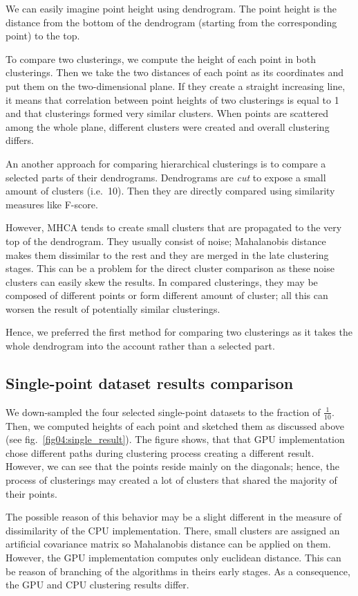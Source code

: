We can easily imagine point height using dendrogram. The point height is the distance from the bottom of the dendrogram (starting from the corresponding point) to the top.

To compare two clusterings, we compute the height of each point in both clusterings. Then we take the two distances of each point as its coordinates and put them on the two-dimensional plane. If they create a straight increasing line, it means that correlation between point heights of two clusterings is equal to 1 and that clusterings formed very similar clusters. When points are scattered among the whole plane, different clusters were created and overall clustering differs.

An another approach for comparing hierarchical clusterings is to compare a selected parts of their dendrograms. Dendrograms are \emph{cut} to expose a small amount of clusters (i.e.~10). Then they are directly compared using similarity measures like F-score.

However, MHCA tends to create small clusters that are propagated to the very top of the dendrogram. They usually consist of noise; Mahalanobis distance makes them dissimilar to the rest and they are merged in the late clustering stages. This can be a problem for the direct cluster comparison as these noise clusters can easily skew the results. In compared clusterings, they may be composed of different points or form different amount of cluster; all this can worsen the result of potentially similar clusterings. 

Hence, we preferred the first method for comparing two clusterings as it takes the whole dendrogram into the account rather than a selected part.

\subsection{Single-point dataset results comparison}

We down-sampled the four selected single-point datasets to the fraction of $\frac{1}{10}$. Then, we computed heights of each point and sketched them as discussed above (see fig.~\ref{fig04:single_result}). The figure shows, that that GPU implementation chose different paths during clustering process creating a different result. However, we can see that the points reside mainly on the diagonals; hence, the process of clusterings may created a lot of clusters that shared the majority of their points.

The possible reason of this behavior may be a slight different in the measure of dissimilarity of the CPU implementation. There, small clusters are assigned an artificial covariance matrix so Mahalanobis distance can be applied on them. However, the GPU implementation computes only euclidean distance. This can be reason of branching of the algorithms in theirs early stages. As a consequence, the GPU and CPU clustering results differ.

